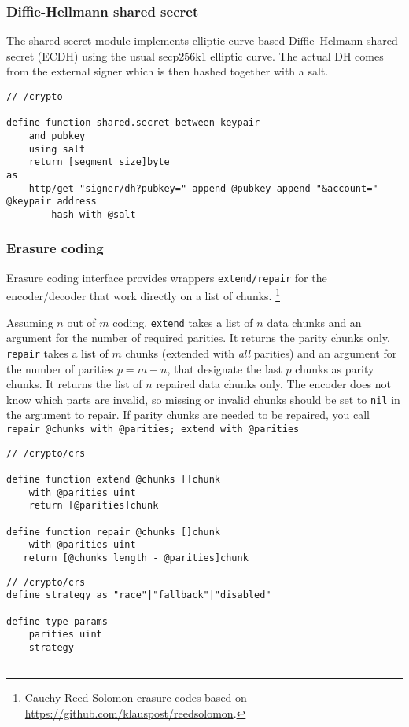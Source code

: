 \subsubsection{Diffie-Hellmann shared secret}

The shared secret module implements elliptic curve based Diffie--Helmann shared secret (ECDH) using the usual secp256k1 elliptic curve.
The actual DH comes from the external signer which is then hashed together with a salt.

\begin{definition}\label{def:dh}
\begin{lstlisting}[language=buzz1]
// /crypto

define function shared.secret between keypair
    and pubkey
    using salt
    return [segment size]byte
as
    http/get "signer/dh?pubkey=" append @pubkey append "&account=" @keypair address
        hash with @salt

\end{lstlisting}
\end{definition}  

\subsubsection{Erasure coding}\label{spec:format:erasure}

Erasure coding interface provides wrappers \lstinline{extend/repair} for the encoder/decoder that work directly on a list of chunks.%
%
\footnote{Cauchy-Reed-Solomon erasure codes based on \url{https://github.com/klauspost/reedsolomon}.
}

Assuming $n$ out of $m$ coding.
\lstinline{extend} takes a list of $n$ data chunks and an argument for the number of required parities. It returns the parity chunks only.
\lstinline{repair} takes a list of $m$ chunks (extended with \emph{all} parities) and an argument for the number of parities $p=m-n$, that designate the last $p$ chunks as parity chunks. It returns the list of $n$ repaired data chunks only.
The encoder does not know which parts are invalid, so missing or invalid chunks should be set to \lstinline{nil} in the argument to repair.
If parity chunks are needed to be repaired, you call \lstinline{repair @chunks with @parities; extend with @parities}

\begin{definition}\label{def:crs}
\begin{lstlisting}[language=buzz1]
// /crypto/crs

define function extend @chunks []chunk 
    with @parities uint
    return [@parities]chunk

define function repair @chunks []chunk   
    with @parities uint
   return [@chunks length - @parities]chunk

\end{lstlisting}
\end{definition}

\begin{definition}\label{def:crs-params}
\begin{lstlisting}[language=buzz1]
// /crypto/crs
define strategy as "race"|"fallback"|"disabled"

define type params 
    parities uint
    strategy 
     
\end{lstlisting}
\end{definition}

